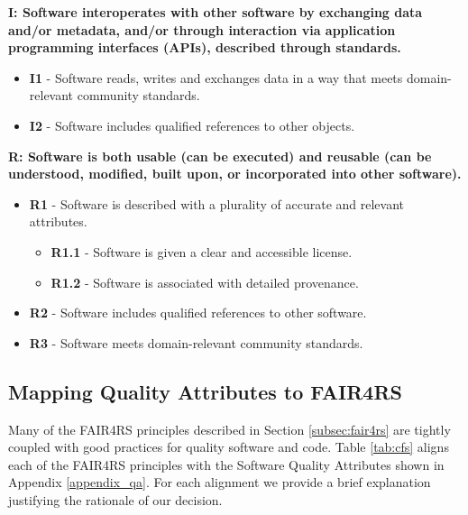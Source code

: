 \textbf{I: Software interoperates with other software by exchanging data and/or metadata, and/or
through interaction via application programming interfaces (APIs), described through
standards.}

\begin{itemize}
    \item \textbf{I1} - Software reads, writes and exchanges data in a way that meets domain-relevant community standards.
    \item \textbf{I2} - Software includes qualified references to other objects.
\end{itemize}

\textbf{R: Software is both usable (can be executed) and reusable (can be understood, modified, built
upon, or incorporated into other software).}

\begin{itemize}
    \item \textbf{R1} - Software is described with a plurality of accurate and relevant attributes.

    \begin{itemize}
        \item \textbf{R1.1} - Software is given a clear and accessible license.
        \item \textbf{R1.2} - Software is associated with detailed provenance.
    \end{itemize}

    \item \textbf{R2} - Software includes qualified references to other software.
    \item \textbf{R3} - Software meets domain-relevant community standards.
\end{itemize}

\subsection{Mapping Quality Attributes to FAIR4RS}\label{subsec:fair4rs_fair}

Many of the FAIR4RS principles described in Section \ref{subsec:fair4rs}  are tightly coupled with good practices for quality software and code. Table \ref{tab:cfs} aligns each of the FAIR4RS principles with the Software Quality Attributes shown in Appendix \ref{appendix_qa}. For each alignment we provide a brief explanation justifying the rationale of our decision. 



